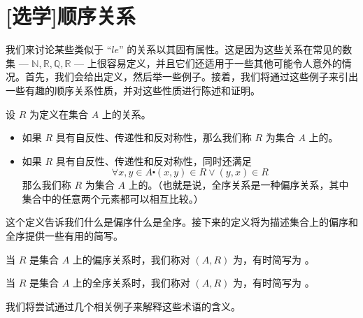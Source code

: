 \section[顺序关系]{[选学]顺序关系}\label{sec:section6.3}

我们来讨论某些类似于 ``$le$'' 的关系以其固有属性。这是因为这些关系在常见的数集 --- $\mathbb{N}, \mathbb{R}, \mathbb{Q}, \mathbb{R}$ --- 上很容易定义，并且它们还适用于一些其他可能令人意外的情况。首先，我们会给出定义，然后举一些例子。接着，我们将通过这些例子来引出一些有趣的顺序关系性质，并对这些性质进行陈述和证明。\\

\begin{definition}
    设 $R$ 为定义在集合 $A$ 上的关系。

    \begin{itemize}
        \item 如果 $R$ 具有自反性、传递性和反对称性，那么我们称 $R$ 为集合 $A$ 上的。
        \item 如果 $R$ 具有自反性、传递性和反对称性，同时还满足
        \[\forall x, y \in A \centerdot (x, y) \in R \lor (y, x) \in R\]
        那么我们称 $R$ 为集合 $A$ 上的。（也就是说，全序关系是一种偏序关系，其中集合中的任意两个元素都可以相互比较。）
    \end{itemize}
\end{definition}

这个定义告诉我们什么是偏序什么是全序。接下来的定义将为描述集合上的偏序和全序提供一些有用的简写。\\

\begin{definition}
    当 $R$ 是集合 $A$ 上的偏序关系时，我们称对 $(A, R)$ 为，有时简写为  。

    当 $R$ 是集合 $A$ 上的全序关系时，我们称对 $(A, R)$ 为，有时简写为  。
\end{definition}

我们将尝试通过几个相关例子来解释这些术语的含义。\\

